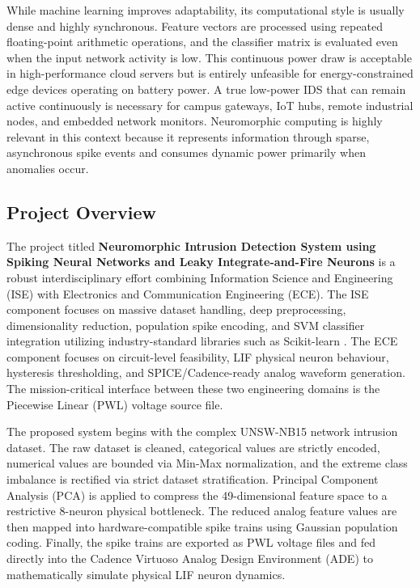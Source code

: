 \documentclass{ieeeaccess}
\begin{document}
While machine learning improves adaptability, its computational style is usually dense and highly synchronous. Feature vectors are processed using repeated floating-point arithmetic operations, and the classifier matrix is evaluated even when the input network activity is low. This continuous power draw is acceptable in high-performance cloud servers but is entirely unfeasible for energy-constrained edge devices operating on battery power. A true low-power IDS that can remain active continuously is necessary for campus gateways, IoT hubs, remote industrial nodes, and embedded network monitors. Neuromorphic computing is highly relevant in this context because it represents information through sparse, asynchronous spike events and consumes dynamic power primarily when anomalies occur.

\subsection{Project Overview}

The project titled \textbf{Neuromorphic Intrusion Detection System using Spiking Neural Networks and Leaky Integrate-and-Fire Neurons} is a robust interdisciplinary effort combining Information Science and Engineering (ISE) with Electronics and Communication Engineering (ECE). The ISE component focuses on massive dataset handling, deep preprocessing, dimensionality reduction, population spike encoding, and SVM classifier integration utilizing industry-standard libraries such as Scikit-learn \cite{Pedregosa2011}. The ECE component focuses on circuit-level feasibility, LIF physical neuron behaviour, hysteresis thresholding, and SPICE/Cadence-ready analog waveform generation. The mission-critical interface between these two engineering domains is the Piecewise Linear (PWL) voltage source file.

The proposed system begins with the complex UNSW-NB15 network intrusion dataset. The raw dataset is cleaned, categorical values are strictly encoded, numerical values are bounded via Min-Max normalization, and the extreme class imbalance is rectified via strict dataset stratification. Principal Component Analysis (PCA) is applied to compress the 49-dimensional feature space to a restrictive 8-neuron physical bottleneck. The reduced analog feature values are then mapped into hardware-compatible spike trains using Gaussian population coding. Finally, the spike trains are exported as PWL voltage files and fed directly into the Cadence Virtuoso Analog Design Environment (ADE) to mathematically simulate physical LIF neuron dynamics.
\end{document}
